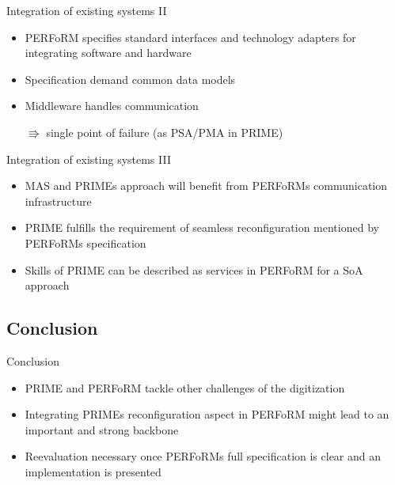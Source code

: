 \documentclass[12pt, xcolor=dvipsnames]{beamer}
\begin{document}
\begin{frame}{Integration of existing systems II}
	\begin{itemize}
		\item PERFoRM specifies standard interfaces and technology adapters for integrating software and hardware
		\newline
		
		\item Specification demand common data models
		\newline
		
		\item Middleware handles communication
		\newline
		
		$\Rrightarrow$ single point of failure (as PSA/PMA in PRIME)
	\end{itemize}
\end{frame}

\begin{frame}{Integration of existing systems III}
	\begin{itemize}
		\item MAS and PRIMEs approach will benefit from PERFoRMs communication infrastructure
		\newline
		
		\item PRIME fulfills the requirement of seamless reconfiguration mentioned by PERFoRMs specification
		\newline
		
		\item Skills of PRIME can be described as services in PERFoRM for a SoA approach
		\newline
		
	\end{itemize}
\end{frame}

\subsection{Conclusion}

\begin{frame}{Conclusion}
	\begin{itemize}
		\item PRIME and PERFoRM tackle other challenges of the digitization
		\newline
		
		\item Integrating PRIMEs reconfiguration aspect in PERFoRM might lead to an important and strong backbone
		\newline
		
		\item Reevaluation necessary once PERFoRMs full specification is clear and an implementation is presented
		\newline
		
	\end{itemize}
\end{frame}
\end{document}
